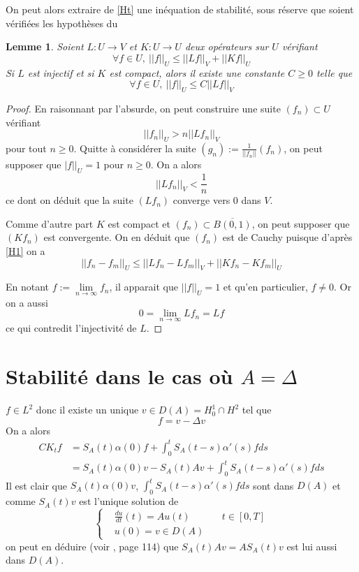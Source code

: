 \documentclass[a4paper]{book}
\newtheorem{lem}{Lemme}[chapter]
\begin{document}
On peut alors extraire de \eqref{Ht} une inéquation de stabilité, sous réserve que soient vérifiées les hypothèses du
\begin{lem}
    Soient $L:U\longrightarrow V$ et $K:U\longrightarrow U$ deux opérateurs sur $U$ vérifiant
    \begin{equation}\label{H1}
        \forall f\in U,\ ||f||_U \leq ||Lf||_V + ||Kf||_U
    \end{equation}
    Si $L$ est injectif et si $K$ est compact, alors il existe une constante $C\geq0$ telle que
    \begin{equation}
        \forall f\in U,\ ||f||_U \leq C||Lf||_V
    \end{equation}
\end{lem}

\begin{proof}
    En raisonnant par l'absurde, on peut construire une suite $(f_n)\subset U$ vérifiant
    \[||f_n||_U > n||Lf_n||_V  \]
    pour tout $n\geq0$.
    Quitte à considérer la suite $(g_n):=\frac{1}{||f_n||}(f_n)$, on peut supposer que $|f||_U=1$ pour $n\geq 0$. On a alors
    \begin{equation}
        ||Lf_n||_V<\frac{1}{n}
    \end{equation}
    ce dont on déduit que la suite $(Lf_n)$ converge vers $0$ dans $V$.

    Comme d'autre part $K$ est compact et $(f_n)\subset\overline{B(0,1)}$, on peut supposer que $(Kf_n)$ est convergente. On en déduit que $(f_n)$ est de Cauchy puisque d'après \eqref{H1} on a
    \[||f_n-f_m||_U \leq ||Lf_n-Lf_m||_V + ||Kf_n-Kf_m||_U \]

    En notant $f:=\lim\limits_{n\rightarrow\infty}f_n$, il apparait que $||f||_U=1$ et qu'en particulier, $f\neq 0$. Or on a aussi
    \[0=\lim\limits_{n\rightarrow\infty}Lf_n=Lf \]
    ce qui contredit l'injectivité de $L$.
\end{proof}
\section{Stabilité dans le cas où $A=\Delta$}
$f\in L^2$ donc il existe un unique $v\in D(A)=H^1_0\cap H^2$ tel que
\[f=v-\Delta v \]
On a alors
\[\begin{aligned}
        CK_tf & =S_A(t)\alpha(0)f +  \int_{0}^{t}S_A(t-s)\alpha'(s)fds              \\
              & =S_A(t)\alpha(0)v -   S_A(t)Av +  \int_{0}^{t}S_A(t-s)\alpha'(s)fds
    \end{aligned} \]
Il est clair que $S_A(t)\alpha(0)v$, $\int_{0}^{t}S_A(t-s)\alpha'(s)fds$ sont dans $D(A)$ et comme $S_A(t)v$ est l'unique solution de
\[\left\lbrace\begin{aligned}
         & \frac{du}{dt}(t)=A u(t) & \  & t\in[0,T] \\
         & u(0)=v \in D(A)
    \end{aligned}\right. \]
on peut en déduire (voir \cite{HB}, page 114) que $S_A(t)Av=AS_A(t)v$ est lui aussi dans $D(A)$.
\end{document}
